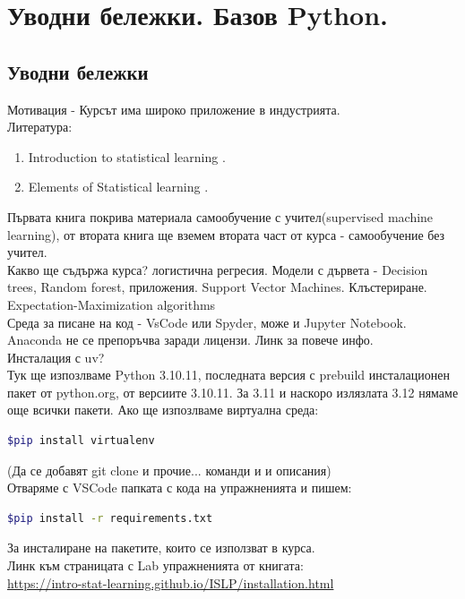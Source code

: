 \section{Уводни бележки. Базов Python.}


\subsection{Уводни бележки}
	Мотивация - Курсът има широко приложение в индустрията.\\	
	Литература:
	\begin{enumerate}
	\item  Introduction to statistical learning \cite{james2023introduction}.
	\item  Elements of Statistical learning  \cite{hastie01statisticallearning}.
	\end{enumerate}
	
	\noindent
	Първата книга покрива материала самообучение с учител(supervised machine learning), от втората книга ще вземем втората част от курса - самообучение без учител. \\
	Какво ще съдържа курса?  логистична регресия.
	Модели с дървета - Decision trees, Random forest, приложения. Support Vector Machines. Клъстериране. Expectation-Maximization algorithms   \\
	
	\noindent	
	Среда за писане на код - VsCode или Spyder, може и Jupyter Notebook. Anaconda не се препоръчва заради лицензи. Линк за повече инфо. \\
	Инсталация с uv? \\
 	Тук ще изпозлваме Python 3.10.11, последната версия с prebuild инсталационен пакет от python.org,
 	от версиите 3.10.11. За 3.11 и наскоро излязлата 3.12 нямаме още всички пакети. Ако ще изпозлваме виртуална среда: 	
 	\begin{lstlisting}[language=bash]
$pip install virtualenv
 	\end{lstlisting}
 	(Да се добавят git clone и прочие... команди и и описания) \\
 	
 	Отваряме с VSCode папката с кода на упражненията и пишем:
	\begin{lstlisting}[language=bash]
$pip install -r requirements.txt
 	\end{lstlisting}
 	За инсталиране на пакетите, които се използват в курса. \\
 	Линк към страницата с Lab упражненията от книгата:\\
 	\href{https://intro-stat-learning.github.io/ISLP/installation.html}{https://intro-stat-learning.github.io/ISLP/installation.html}
 	
